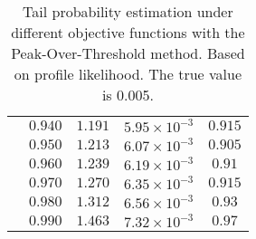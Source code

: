\begin{table}[ht]
{\begin{tabular}{cc|ccc}
&$0.940$ & $1.191$ & $5.95\times 10^{-3}$ & $0.915$\\
&$0.950$ & $1.213$ & $6.07\times 10^{-3}$ & $0.905$\\
&$0.960$ & $1.239$ & $6.19\times 10^{-3}$ & $0.91$\\
&$0.970$ & $1.270$ & $6.35\times 10^{-3}$ & $0.915$\\
&$0.980$ & $1.312$ & $6.56\times 10^{-3}$ & $0.93$\\
&$0.990$ & $1.463$ & $7.32\times 10^{-3}$ & $0.97$\\
    \hline
    \bottomrule
    \end{tabular}}\caption{Tail probability estimation under different objective functions with the Peak-Over-Threshold method. Based on profile likelihood. The true value is 0.005.}
    \label{tb5_tpe}
\end{table}